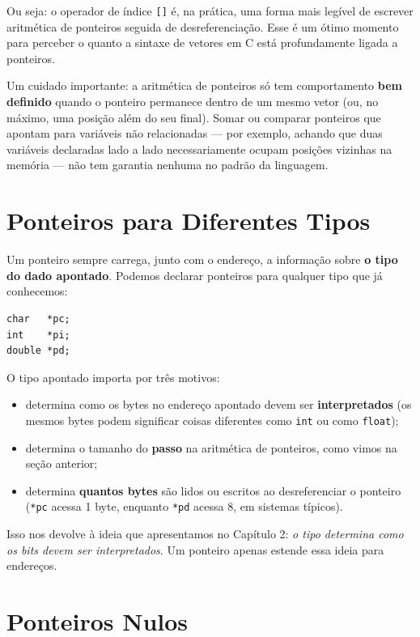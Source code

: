 Ou seja: o operador de índice \texttt{[]} é, na prática, uma forma mais legível de escrever aritmética de ponteiros seguida de desreferenciação. Esse é um ótimo momento para perceber o quanto a sintaxe de vetores em C está profundamente ligada a ponteiros.

Um cuidado importante: a aritmética de ponteiros só tem comportamento \textbf{bem definido} quando o ponteiro permanece dentro de um mesmo vetor (ou, no máximo, uma posição além do seu final). Somar ou comparar ponteiros que apontam para variáveis não relacionadas — por exemplo, achando que duas variáveis declaradas lado a lado necessariamente ocupam posições vizinhas na memória — não tem garantia nenhuma no padrão da linguagem.

\section{Ponteiros para Diferentes Tipos}

Um ponteiro sempre carrega, junto com o endereço, a informação sobre \textbf{o tipo do dado apontado}. Podemos declarar ponteiros para qualquer tipo que já conhecemos:

\begin{lstlisting}
char   *pc;
int    *pi;
double *pd;
\end{lstlisting}

O tipo apontado importa por três motivos:

\begin{itemize}
    \item determina como os bytes no endereço apontado devem ser \textbf{interpretados} (os mesmos bytes podem significar coisas diferentes como \texttt{int} ou como \texttt{float});
    \item determina o tamanho do \textbf{passo} na aritmética de ponteiros, como vimos na seção anterior;
    \item determina \textbf{quantos bytes} são lidos ou escritos ao desreferenciar o ponteiro (\texttt{*pc} acessa 1 byte, enquanto \texttt{*pd} acessa 8, em sistemas típicos).
\end{itemize}

Isso nos devolve à ideia que apresentamos no Capítulo 2: \textit{o tipo determina como os bits devem ser interpretados}. Um ponteiro apenas estende essa ideia para endereços.

\section{Ponteiros Nulos}

